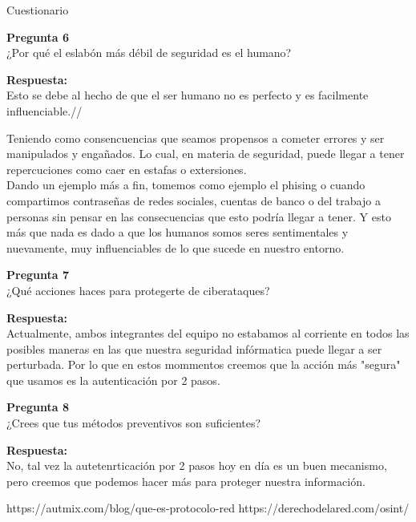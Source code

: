 \documentclass{article}
\newenvironment{problem}[2][Pregunta]
    { \begin{mdframed}[backgroundcolor=gray!20] \textbf{#1 #2} \\}
    {  \end{mdframed}}
\newenvironment{solution}
    {\textbf{Respuesta:\\}}
    {}
\begin{document}
\begin{section}{Cuestionario}
\begin{problem}
    {6} ¿Por qué el eslabón más débil de seguridad es el humano?
\end{problem}

\begin{solution}
    Esto se debe al hecho de que el ser humano no es perfecto y es facilmente influenciable.//

    Teniendo como consencuencias que seamos propensos a cometer errores y ser manipulados y engañados. Lo cual, en materia de seguridad, puede llegar a tener repercuciones como caer en estafas o extersiones.\\
    Dando un ejemplo más a fin, tomemos como ejemplo el phising o cuando compartimos contraseñas de redes sociales, cuentas de banco o del trabajo a personas sin pensar en las consecuencias que esto podría llegar a tener. Y esto más que nada es dado a que los humanos somos seres sentimentales y nuevamente, muy influenciables de lo que sucede en nuestro entorno.
    
\end{solution}

\begin{problem}
    {7} ¿Qué acciones haces para protegerte de ciberataques? 
\end{problem}

\begin{solution}
    Actualmente, ambos integrantes del equipo no estabamos al corriente en todos las posibles maneras en las que nuestra seguridad infórmatica puede llegar a ser perturbada. Por lo que en estos mommentos creemos que la acción más "segura" que usamos es la autenticación por 2 pasos.
\end{solution}

\begin{problem}
    {8}  ¿Crees que tus métodos preventivos son suficientes?
\end{problem}

\begin{solution}
    No, tal vez la autetenrticación por 2 pasos hoy en día es un buen mecanismo, pero creemos que podemos hacer más para proteger nuestra información.
\end{solution}

\end{section}
\begin{thebibliography}{2} %
\bibitem{} https://autmix.com/blog/que-es-protocolo-red
\bibitem{} https://derechodelared.com/osint/
\end{thebibliography}
\end{document}
